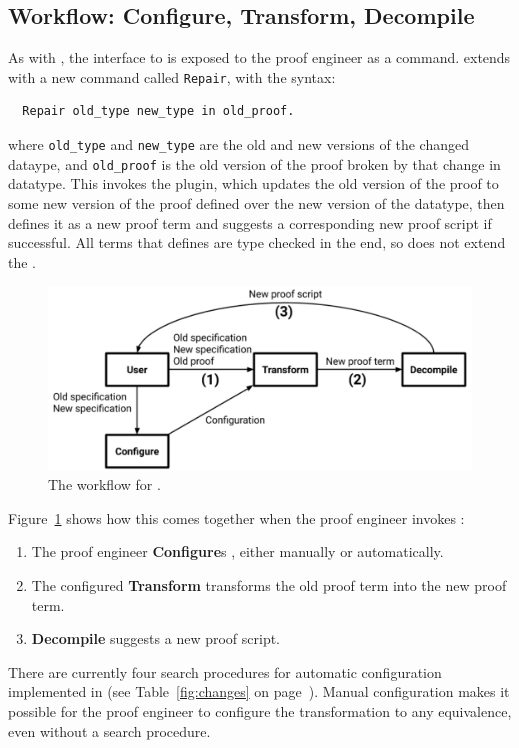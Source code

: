 \subsection{Workflow: Configure, Transform, Decompile}
\label{sec:pi-workflow}

As with \kl{\sysname}, the interface to \toolnamec is exposed to the proof engineer as a command.
\toolnamec extends \sysnamelong with a new command called \lstinline{Repair},
with the syntax:

\begin{lstlisting}
  Repair old_type new_type in old_proof.
\end{lstlisting}
where \lstinline{old_type} and \lstinline{new_type} are the old and new 
versions of the changed dataype, and \lstinline{old_proof} is the old version
of the proof broken by that change in datatype.
This invokes the \toolnamec plugin, which updates the old version of the proof to some new version of the proof
defined over the new version of the datatype, then defines it as a new proof term and suggests a corresponding new proof script if successful.
All terms that \toolnamec defines are type checked in the end, so \toolnamec does not extend the .

\begin{figure}
\includegraphics[width=\columnwidth]{often/workflowa.pdf}
\vspace{-0.7cm}
\caption{The workflow for \toolnamec.}
\vspace{-0.1cm}
\label{fig:system}
\end{figure}

Figure~\ref{fig:system} shows how this comes together when the proof engineer invokes \toolnamec:

\begin{enumerate}
\item The proof engineer \textbf{Configure}s \toolnamec, either manually or automatically.
\item The configured \textbf{Transform} transforms the old proof term into the new proof term.
\item \textbf{Decompile} suggests a new proof script. %
\end{enumerate}
There are currently four search procedures for automatic configuration implemented in \toolnamec (see Table~\ref{fig:changes} on page~\pageref{fig:changes}).
Manual configuration makes it possible
for the proof engineer to configure the transformation to any equivalence,
even without a search procedure.

